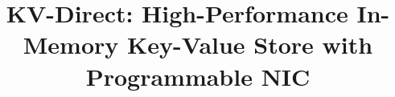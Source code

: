 \documentclass[preprint]{sigplanconf}
\begin{document}


\setlength{\pdfpageheight}{\paperheight}
\setlength{\pdfpagewidth}{\paperwidth}


\title{KV-Direct: High-Performance In-Memory Key-Value Store with Programmable NIC \vspace{-0.1in}}

           {}
           {}

\def\name{KV-Direct}
\def\fullname{Remote Direct Key-Value Access}
\def\sysname{}

\newcommand{\authornote}[1]{\raisebox{0.8ex}{$#1$}}
\maketitle

\newcommand{\specialcell}[2][c]{%
  \begin{tabular}[#1]{@{}c@{}}#2\end{tabular}}












\balance


\end{document}
